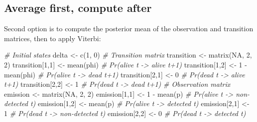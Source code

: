 \documentclass[
  12pt,
]{krantz}
\newenvironment{Shaded}{\begin{snugshade}}{\end{snugshade}}
\newcommand{\CommentTok}[1]{\textcolor[rgb]{0.56,0.35,0.01}{\textit{#1}}}
\newcommand{\ConstantTok}[1]{\textcolor[rgb]{0.00,0.00,0.00}{#1}}
\newcommand{\DecValTok}[1]{\textcolor[rgb]{0.00,0.00,0.81}{#1}}
\newcommand{\FunctionTok}[1]{\textcolor[rgb]{0.00,0.00,0.00}{#1}}
\newcommand{\NormalTok}[1]{#1}
\newcommand{\OtherTok}[1]{\textcolor[rgb]{0.56,0.35,0.01}{#1}}
\newcommand{\SpecialCharTok}[1]{\textcolor[rgb]{0.00,0.00,0.00}{#1}}
\begin{document}
\hypertarget{average-first-compute-after}{%
\subsection{Average first, compute after}\label{average-first-compute-after}}

Second option is to compute the posterior mean of the observation and transition matrices, then to apply Viterbi:

\begin{Shaded}
\begin{Highlighting}[]
\CommentTok{\# Initial states}
\NormalTok{delta }\OtherTok{\textless{}{-}} \FunctionTok{c}\NormalTok{(}\DecValTok{1}\NormalTok{, }\DecValTok{0}\NormalTok{)}
\CommentTok{\# Transition matrix}
\NormalTok{transition }\OtherTok{\textless{}{-}} \FunctionTok{matrix}\NormalTok{(}\ConstantTok{NA}\NormalTok{, }\DecValTok{2}\NormalTok{, }\DecValTok{2}\NormalTok{)}
\NormalTok{transition[}\DecValTok{1}\NormalTok{,}\DecValTok{1}\NormalTok{] }\OtherTok{\textless{}{-}} \FunctionTok{mean}\NormalTok{(phi)      }\CommentTok{\# Pr(alive t {-}\textgreater{} alive t+1)}
\NormalTok{transition[}\DecValTok{1}\NormalTok{,}\DecValTok{2}\NormalTok{] }\OtherTok{\textless{}{-}} \DecValTok{1} \SpecialCharTok{{-}} \FunctionTok{mean}\NormalTok{(phi)  }\CommentTok{\# Pr(alive t {-}\textgreater{} dead t+1)}
\NormalTok{transition[}\DecValTok{2}\NormalTok{,}\DecValTok{1}\NormalTok{] }\OtherTok{\textless{}{-}} \DecValTok{0}              \CommentTok{\# Pr(dead t {-}\textgreater{} alive t+1)}
\NormalTok{transition[}\DecValTok{2}\NormalTok{,}\DecValTok{2}\NormalTok{] }\OtherTok{\textless{}{-}} \DecValTok{1}              \CommentTok{\# Pr(dead t {-}\textgreater{} dead t+1)}
\CommentTok{\# Observation matrix }
\NormalTok{emission }\OtherTok{\textless{}{-}} \FunctionTok{matrix}\NormalTok{(}\ConstantTok{NA}\NormalTok{, }\DecValTok{2}\NormalTok{, }\DecValTok{2}\NormalTok{)}
\NormalTok{emission[}\DecValTok{1}\NormalTok{,}\DecValTok{1}\NormalTok{] }\OtherTok{\textless{}{-}} \DecValTok{1} \SpecialCharTok{{-}} \FunctionTok{mean}\NormalTok{(p)      }\CommentTok{\# Pr(alive t {-}\textgreater{} non{-}detected t)}
\NormalTok{emission[}\DecValTok{1}\NormalTok{,}\DecValTok{2}\NormalTok{] }\OtherTok{\textless{}{-}} \FunctionTok{mean}\NormalTok{(p)          }\CommentTok{\# Pr(alive t {-}\textgreater{} detected t)}
\NormalTok{emission[}\DecValTok{2}\NormalTok{,}\DecValTok{1}\NormalTok{] }\OtherTok{\textless{}{-}} \DecValTok{1}                \CommentTok{\# Pr(dead t {-}\textgreater{} non{-}detected t)}
\NormalTok{emission[}\DecValTok{2}\NormalTok{,}\DecValTok{2}\NormalTok{] }\OtherTok{\textless{}{-}} \DecValTok{0}                \CommentTok{\# Pr(dead t {-}\textgreater{} detected t)}

\end{Highlighting}
\end{Shaded}
\end{document}
